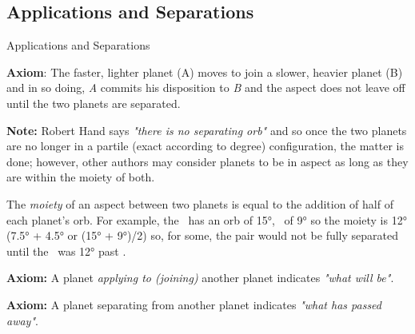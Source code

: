 \subsection{Applications and Separations}

\begin{frame}[t]{Applications and Separations}
\begin{block}{}
\textbf{Axiom}: The faster, lighter planet (A) moves to join a slower, heavier planet (B) and in so doing, \textsl{A} commits his disposition to \textsl{B} and the aspect does not leave off until the two planets are separated.
\end{block}

\begin{mdframed}[backgroundcolor=gray!5, rightmargin=2em, leftmargin=2em]
\textbf{Note:} Robert Hand says \textsl{"there is no separating orb"} and so once the two planets are no longer in a partile (exact according to degree) configuration, the matter is done; however, other authors may consider planets to be in aspect as long as they are within the moiety of both. 

The \textsl{moiety} of an aspect between two planets is equal to the addition of half of each planet's orb. For example, the \Sun\ has an orb of 15°, \Saturn\ of 9° so the moiety is 12° (7.5° + 4.5° or (15° + 9°)/2) so, for some, the pair would not be fully separated until the \Sun\ was 12° past \Saturn.
\end{mdframed}

\begin{block}{}
\textbf{Axiom:} A planet \textsl{applying to (joining)} another planet indicates \textsl{"what will be"}. 
\end{block}

\begin{block}{}
\textbf{Axiom:} A planet separating from another planet indicates \textsl{"what has passed away"}.
\end{block}

\end{frame}